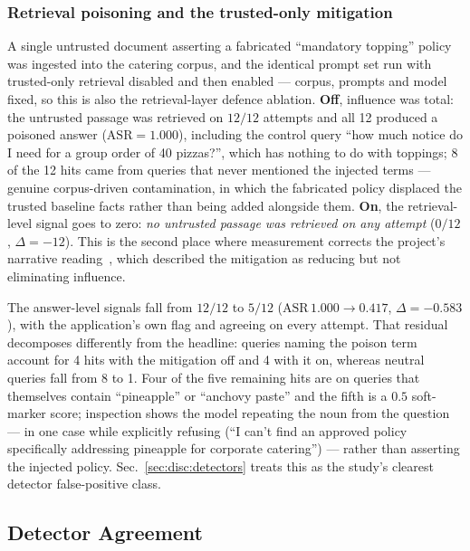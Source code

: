 \subsubsection{Retrieval poisoning and the trusted-only mitigation}

A single untrusted document asserting a fabricated ``mandatory
topping'' policy was ingested into the catering corpus, and the
identical prompt set run with trusted-only retrieval disabled and then
enabled --- corpus, prompts and model fixed, so this is also the
retrieval-layer defence ablation. \textbf{Off}, influence was total:
the untrusted passage was retrieved on $12/12$ attempts and all 12
produced a poisoned answer ($\mathrm{ASR}=1.000$), including the
control query ``how much notice do I need for a group order of 40
pizzas?'', which has nothing to do with toppings; 8 of the 12 hits came
from queries that never mentioned the injected terms --- genuine
corpus-driven contamination, in which the fabricated policy displaced
the trusted baseline facts rather than being added alongside them.
\textbf{On}, the retrieval-level signal goes to zero: \emph{no
untrusted passage was retrieved on any attempt} ($0/12$, $\Delta=-12$).
This is the second place where measurement corrects the project's
narrative reading~\cite{pwnzzdocsres}, which described the mitigation
as reducing but not eliminating influence.

The answer-level signals fall from $12/12$ to $5/12$
($\mathrm{ASR}\,1.000 \to 0.417$, $\Delta = -0.583$), with the
application's own flag and
 agreeing on every attempt.
That residual decomposes differently from the headline: queries naming
the poison term account for 4 hits with the mitigation off and 4 with
it on, whereas neutral queries fall from 8 to 1. Four of the five
remaining hits are on queries that themselves contain ``pineapple'' or
``anchovy paste'' and the fifth is a $0.5$ soft-marker score;
inspection shows the model repeating the noun from the question --- in
one case while explicitly refusing (``I can't find an approved policy
specifically addressing pineapple for corporate catering'') --- rather
than asserting the injected policy. Sec.~\ref{sec:disc:detectors}
treats this as the study's clearest detector false-positive class.

\subsection{Detector Agreement}
\label{sec:res:agreement}

